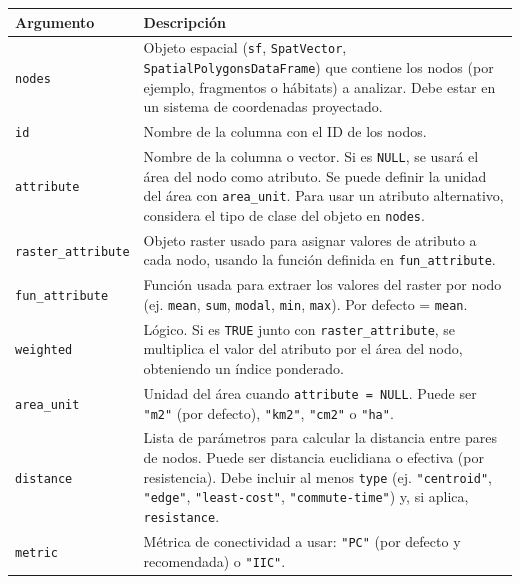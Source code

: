 \documentclass[
]{book}
\begin{document}
\begin{longtable}[]{@{}
  >{\raggedright\arraybackslash}p{}
  >{\raggedright\arraybackslash}p{}@{}}
\toprule\noalign{}
\begin{minipage}[b]{\linewidth}\raggedright
\textbf{Argumento}
\end{minipage} & \begin{minipage}[b]{\linewidth}\raggedright
\textbf{Descripción}
\end{minipage} \\
\midrule\noalign{}
\endhead
\bottomrule\noalign{}
\endlastfoot
\texttt{nodes} & Objeto espacial (\texttt{sf}, \texttt{SpatVector}, \texttt{SpatialPolygonsDataFrame}) que contiene los nodos (por ejemplo, fragmentos o hábitats) a analizar. Debe estar en un sistema de coordenadas proyectado. \\
\texttt{id} & Nombre de la columna con el ID de los nodos. \\
\texttt{attribute} & Nombre de la columna o vector. Si es \texttt{NULL}, se usará el área del nodo como atributo. Se puede definir la unidad del área con \texttt{area\_unit}. Para usar un atributo alternativo, considera el tipo de clase del objeto en \texttt{nodes}. \\
\texttt{raster\_attribute} & Objeto raster usado para asignar valores de atributo a cada nodo, usando la función definida en \texttt{fun\_attribute}. \\
\texttt{fun\_attribute} & Función usada para extraer los valores del raster por nodo (ej. \texttt{mean}, \texttt{sum}, \texttt{modal}, \texttt{min}, \texttt{max}). Por defecto = \texttt{mean}. \\
\texttt{weighted} & Lógico. Si es \texttt{TRUE} junto con \texttt{raster\_attribute}, se multiplica el valor del atributo por el área del nodo, obteniendo un índice ponderado. \\
\texttt{area\_unit} & Unidad del área cuando \texttt{attribute\ =\ NULL}. Puede ser \texttt{"m2"} (por defecto), \texttt{"km2"}, \texttt{"cm2"} o \texttt{"ha"}. \\
\texttt{distance} & Lista de parámetros para calcular la distancia entre pares de nodos. Puede ser distancia euclidiana o efectiva (por resistencia). Debe incluir al menos \texttt{type} (ej. \texttt{"centroid"}, \texttt{"edge"}, \texttt{"least-cost"}, \texttt{"commute-time"}) y, si aplica, \texttt{resistance}. \\
\texttt{metric} & Métrica de conectividad a usar: \texttt{"PC"} (por defecto y recomendada) o \texttt{"IIC"}. \\

\end{longtable}
\end{document}
